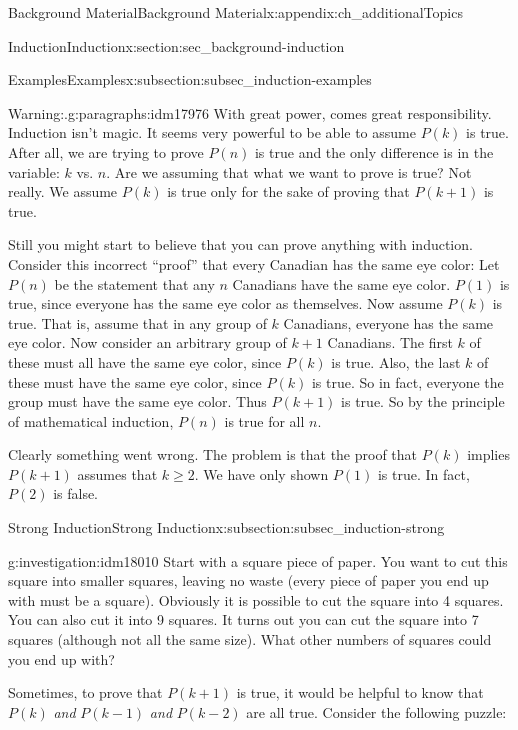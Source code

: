 \documentclass[oneside,10pt,]{book}
\numberwithin{equation}{chapter}
\begin{document}
\begin{appendixptx}{Background Material}{}{Background Material}{}{}{x:appendix:ch_additionalTopics}
\begin{sectionptx}{Induction}{}{Induction}{}{}{x:section:sec_background-induction}
\begin{subsectionptx}{Examples}{}{Examples}{}{}{x:subsection:subsec_induction-examples}
\begin{paragraphs}{Warning:.}{g:paragraphs:idm17976}
With great power, comes great responsibility. Induction isn't magic. It seems very powerful to be able to assume \(P(k)\) is true. After all, we are trying to prove \(P(n)\) is true and the only difference is in the variable: \(k\) vs. \(n\). Are we assuming that what we want to prove is true? Not really. We assume \(P(k)\) is true only for the sake of proving that \(P(k+1)\) is true.%
\par
Still you might start to believe that you can prove anything with induction. Consider this incorrect ``proof'' that every Canadian has the same eye color: Let \(P(n)\) be the statement that any \(n\) Canadians have the same eye color. \(P(1)\) is true, since everyone has the same eye color as themselves. Now assume \(P(k)\) is true. That is, assume that in any group of \(k\) Canadians, everyone has the same eye color. Now consider an arbitrary group of \(k+1\) Canadians. The first \(k\) of these must all have the same eye color, since \(P(k)\) is true. Also, the last \(k\) of these must have the same eye color, since \(P(k)\) is true. So in fact, everyone the group must have the same eye color. Thus \(P(k+1)\) is true. So by the principle of mathematical induction, \(P(n)\) is true for all \(n\).%
\par
Clearly something went wrong. The problem is that the proof that \(P(k)\) implies \(P(k+1)\) assumes that \(k \ge 2\). We have only shown \(P(1)\) is true. In fact, \(P(2)\) is false.%
\end{paragraphs}%
\end{subsectionptx}
%
%
\typeout{************************************************}
\typeout{************************************************}
%
\begin{subsectionptx}{Strong Induction}{}{Strong Induction}{}{}{x:subsection:subsec_induction-strong}
\begin{investigation}{}{g:investigation:idm18010}%
Start with a square piece of paper. You want to cut this square into smaller squares, leaving no waste (every piece of paper you end up with must be a square). Obviously it is possible to cut the square into 4 squares. You can also cut it into 9 squares. It turns out you can cut the square into 7 squares (although not all the same size). What other numbers of squares could you end up with?%
\end{investigation}
Sometimes, to prove that \(P(k+1)\) is true, it would be helpful to know that \(P(k)\) \emph{and} \(P(k-1)\) \emph{and} \(P(k-2)\) are all true. Consider the following puzzle:%

\end{subsectionptx}
\end{sectionptx}
\end{appendixptx}
\end{document}
